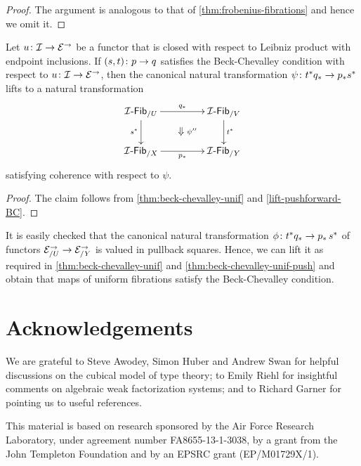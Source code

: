\documentclass[reqno,10pt,a4paper,oneside,draft]{amsart}
\begin{document}
\begin{proof} The argument is analogous to that of \cref{thm:frobenius-fibrations} and hence we omit it.
\end{proof}


\begin{corollary} \label{thm:beck-chevalley-unif-push}
Let $u \colon \mathcal{I} \to \mathcal{E}^\to$ be a functor that is closed with respect to Leibniz product with endpoint inclusions.
If $(s,t) \colon p \to q$ satisfies the Beck-Chevalley condition with respect to $u \colon \mathcal{I} \to \mathcal{E}^\to$, then the canonical natural transformation $\psi \colon t^* q_* \to p_* s^*$ lifts to a natural transformation
\[
\xymatrix@C+2em{
  \Fib[\cal{I}]_{/U}
  \ar[r]^{q_*}
  \ar[d]_{s^*}
  \ar@{}[dr]|{\textstyle\Downarrow \rlap{$\labelstyle \psi''$}}
&
  \Fib[\cal{I}]_{/V}
  \ar[d]^{t^*}
\\
  \Fib[\cal{I}]_{/X}
  \ar[r]_{p_*}
&
  \Fib[\cal{I}]_{/Y}
}
\]
satisfying coherence with respect to $\psi$.
\end{corollary}

\begin{proof}
 The claim follows from \cref{thm:beck-chevalley-unif} and \cref{lift-pushforward-BC}.
\end{proof}


\begin{example}
It is easily checked that the canonical natural transformation $\phi \colon t^* q_* \to p_* \, s^*$ of functors $\mathcal{E}_{/U}^\to \to \mathcal{E}_{/Y}^\to$ is valued in pullback squares.
Hence, we can lift it as required in \cref{thm:beck-chevalley-unif} and \cref{thm:beck-chevalley-unif-push} and obtain that maps of uniform fibrations satisfy the Beck-Chevalley condition.
\end{example}


\section*{Acknowledgements}

We are grateful to Steve Awodey, Simon Huber and Andrew Swan for helpful discussions on the cubical model of type theory; to Emily Riehl for insightful comments on algebraic weak factorization systems; and to Richard Garner for pointing us to useful references.

This material is based on research sponsored by the Air Force Research Laboratory, under agreement number FA8655-13-1-3038, by a grant from the John Templeton Foundation and by an EPSRC grant (EP/M01729X/1).
\end{document}
